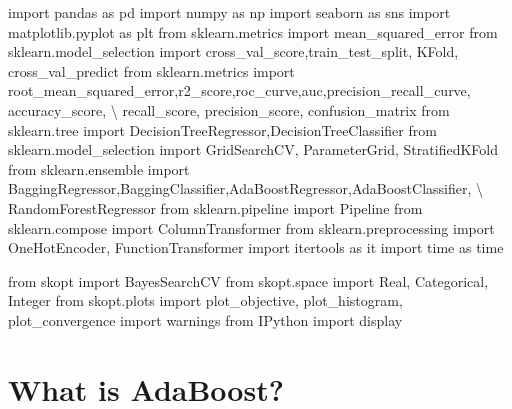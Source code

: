 \documentclass[
  letterpaper,
  DIV=11,
  numbers=noendperiod]{scrreprt}
\newenvironment{Shaded}{\begin{snugshade}}{\end{snugshade}}
\newcommand{\ImportTok}[1]{\textcolor[rgb]{0.00,0.46,0.62}{#1}}
\newcommand{\NormalTok}[1]{\textcolor[rgb]{0.00,0.23,0.31}{#1}}
\newcommand{\OperatorTok}[1]{\textcolor[rgb]{0.37,0.37,0.37}{#1}}
\begin{document}
\begin{Shaded}
\begin{Highlighting}[]
\ImportTok{import}\NormalTok{ pandas }\ImportTok{as}\NormalTok{ pd}
\ImportTok{import}\NormalTok{ numpy }\ImportTok{as}\NormalTok{ np}
\ImportTok{import}\NormalTok{ seaborn }\ImportTok{as}\NormalTok{ sns}
\ImportTok{import}\NormalTok{ matplotlib.pyplot }\ImportTok{as}\NormalTok{ plt}
\ImportTok{from}\NormalTok{ sklearn.metrics }\ImportTok{import}\NormalTok{ mean\_squared\_error}
\ImportTok{from}\NormalTok{ sklearn.model\_selection }\ImportTok{import}\NormalTok{ cross\_val\_score,train\_test\_split, KFold, cross\_val\_predict}
\ImportTok{from}\NormalTok{ sklearn.metrics }\ImportTok{import}\NormalTok{ root\_mean\_squared\_error,r2\_score,roc\_curve,auc,precision\_recall\_curve, accuracy\_score, }\OperatorTok{\textbackslash{}}
\NormalTok{recall\_score, precision\_score, confusion\_matrix}
\ImportTok{from}\NormalTok{ sklearn.tree }\ImportTok{import}\NormalTok{ DecisionTreeRegressor,DecisionTreeClassifier}
\ImportTok{from}\NormalTok{ sklearn.model\_selection }\ImportTok{import}\NormalTok{ GridSearchCV, ParameterGrid, StratifiedKFold}
\ImportTok{from}\NormalTok{ sklearn.ensemble }\ImportTok{import}\NormalTok{ BaggingRegressor,BaggingClassifier,AdaBoostRegressor,AdaBoostClassifier, }\OperatorTok{\textbackslash{}}
\NormalTok{RandomForestRegressor}
\ImportTok{from}\NormalTok{ sklearn.pipeline }\ImportTok{import}\NormalTok{ Pipeline}
\ImportTok{from}\NormalTok{ sklearn.compose }\ImportTok{import}\NormalTok{ ColumnTransformer}
\ImportTok{from}\NormalTok{ sklearn.preprocessing }\ImportTok{import}\NormalTok{ OneHotEncoder, FunctionTransformer}
\ImportTok{import}\NormalTok{ itertools }\ImportTok{as}\NormalTok{ it}
\ImportTok{import}\NormalTok{ time }\ImportTok{as}\NormalTok{ time}

\ImportTok{from}\NormalTok{ skopt }\ImportTok{import}\NormalTok{ BayesSearchCV}
\ImportTok{from}\NormalTok{ skopt.space }\ImportTok{import}\NormalTok{ Real, Categorical, Integer}
\ImportTok{from}\NormalTok{ skopt.plots }\ImportTok{import}\NormalTok{ plot\_objective, plot\_histogram, plot\_convergence}
\ImportTok{import}\NormalTok{ warnings}
\ImportTok{from}\NormalTok{ IPython }\ImportTok{import}\NormalTok{ display}
\end{Highlighting}
\end{Shaded}

\section{What is AdaBoost?}\label{what-is-adaboost}
\end{document}
